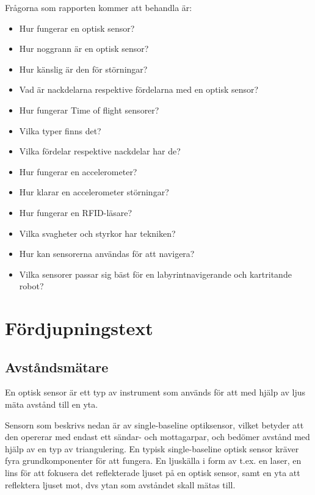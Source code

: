 \documentclass[a4paper,12pt,fleqn]{article}
\begin{document}
Frågorna som rapporten kommer att behandla är:
\begin{itemize}

\item Hur fungerar en optisk sensor? 
\item Hur noggrann är en optisk sensor?
\item Hur känslig är den för störningar?
\item Vad är nackdelarna respektive fördelarna med en optisk sensor?

\item Hur fungerar Time of flight sensorer?
\item Vilka typer finns det?
\item Vilka fördelar respektive nackdelar har de?

\item Hur fungerar en accelerometer? 
\item Hur klarar en accelerometer störningar?

\item Hur fungerar en RFID-läsare?
\item Vilka svagheter och styrkor har tekniken?

\item Hur kan sensorerna användas för att navigera?
\item Vilka sensorer passar sig bäst för en labyrintnavigerande och kartritande robot?
\end{itemize}

\section{Fördjupningstext}
\subsection{Avståndsmätare}
En optisk sensor är ett typ av instrument som används för att med hjälp av ljus mäta avstånd till en yta.

Sensorn som beskrivs nedan är av single-baseline optiksensor, vilket betyder att den opererar med endast ett sändar- och mottagarpar, och bedömer avstånd med hjälp av en typ av triangulering.
En typisk single-baseline optisk sensor kräver fyra grundkomponenter för att fungera.
En ljuskälla i form av t.ex. en laser, en lins för att fokusera det reflekterade ljuset på 
en optisk sensor, samt en yta att reflektera ljuset mot, dvs ytan som avståndet skall mätas till.
\end{document}
